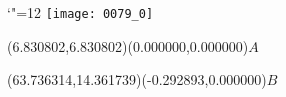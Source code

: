 \documentclass[12pt]{article}
\begin{document}
\makeatletter%
\let\ASYencoding\f@encoding%
\let\ASYfamily\f@family%
\let\ASYseries\f@series%
\let\ASYshape\f@shape%
\makeatother%
{\catcode`"=12%
\texttt{[image: 0079\_0]}%
}%
\kern -80.611806pt%
%
%
\fontsize{26.000000}{31.200000}\selectfont%
\usefont{\ASYencoding}{\ASYfamily}{\ASYseries}{\ASYshape}%
\ASYalign(6.830802,6.830802)(0.000000,0.000000){$A$}%
%
%
\fontsize{26.000000}{31.200000}\selectfont%
\ASYalign(63.736314,14.361739)(-0.292893,0.000000){$B$}%
\end{document}
